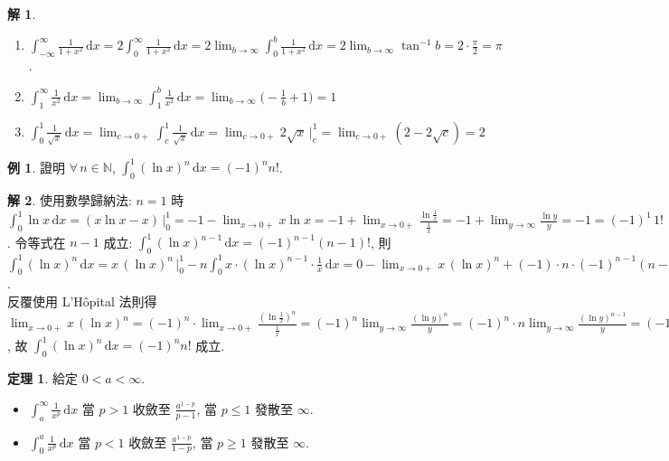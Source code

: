 \documentclass[12pt]{extarticle}
\newcommand{\ds}{\displaystyle}
\theoremstyle{definition}
\newtheorem*{thm}{定理}
\newtheorem*{ex}{例}
\newtheorem*{sol}{解}
\begin{document}
\begin{sol}\leavevmode
  \begin{enumerate}\setlength{\itemsep}{0pt}
    \item $\ds\int_{-\infty}^{\infty}\!\frac{1}{1 + x^2}\,\text{d}x = 2\int_0^\infty\!\frac{1}{1 + x^2}\,\text{d}x = 2\lim_{b\to\infty}\int_0^b\!\frac{1}{1 + x^2}\,\text{d}x = 2\lim_{b\to\infty}\tan^{-1} b = 2\cdot\frac{\pi}{2} = \pi$. 
    \item $\ds\int_{1}^{\infty}\!\frac{1}{x^2}\,\text{d}x = \lim_{b\to\infty}\int_1^b\!\frac{1}{x^2}\,\text{d}x = \lim_{b\to\infty}\Big(-\frac{1}{b} + 1\Big) = 1$
    \item $\ds\int_0^1\!\frac{1}{\sqrt{x}}\,\text{d}x = \lim_{c\to0+}\int_c^1\!\frac{1}{\sqrt{x}}\,\text{d}x = \lim_{c\to0+}2\sqrt{x}\,\Big|^1_c = \lim_{c\to0+}(2-2\sqrt{c}) = 2$
  \end{enumerate}
\end{sol}

\begin{ex}
  證明 $\forall\,n\in\mathbb{N}$, $\ds\int_0^1(\ln x)^n\,\text{d}x = (-1)^n n!$.
\end{ex}

\begin{sol}
  使用數學歸納法: $n = 1$ 時 $\ds\int_0^1\ln x\,\text{d}x = (x\ln x - x)\,\Big|_0^1 = -1 - \lim_{x\to 0+}x\ln x = -1 + \lim_{x\to 0+}\frac{\ln\frac{1}{x}}{\frac{1}{x}} = -1 + \lim_{y\to\infty}\frac{\ln y}{y} = -1 = (-1)^1\,1!$. 令等式在 $n - 1$ 成立: $\ds\int_0^1(\ln x)^{n - 1}\,\text{d}x = (-1)^{n - 1} (n - 1)!$, 則 $\ds\int_0^1(\ln x)^n\,\text{d}x = x\,(\ln x)^n\,\Big|_0^1 - n\int_0^1\!x\cdot(\ln x)^{n - 1}\cdot\frac{1}{x}\,\text{d}x = 0 - \lim_{x\to0+}x\,(\ln x)^n + (-1)\cdot n\cdot(-1)^{n - 1}(n - 1)! = -\lim_{x\to0+}x\,(\ln x)^n + (-1)^n n!$. \\ 反覆使用 L'H\^opital 法則得 $\ds\lim_{x\to0+}x\,(\ln x)^n = (-1)^n\cdot\lim_{x\to0+}\frac{(\ln\frac{1}{x})^n}{\frac{1}{x}} = (-1)^n\lim_{y\to\infty}\frac{(\ln y)^n}{y} = (-1)^n\cdot n\lim_{y\to\infty}\frac{(\ln y)^{n - 1}}{y} = (-1)^n\cdot n(n - 1)\lim_{y\to\infty}\frac{(\ln y)^{n - 2}}{y} = \cdots = (-1)^n\,n!\lim_{y\to\infty}\frac{1}{y} = 0$, 故 $\ds\int_0^1(\ln x)^n\,\text{d}x = (-1)^n n!$ 成立. 
\end{sol}

\begin{thm} 給定 $\ds 0 < a < \infty$. 
  \begin{itemize}\setlength{\itemsep}{0pt}
    \item $\ds\int_a^\infty\!\frac{1}{x^p}\,\text{d}x$ 當 $p > 1$ 收斂至 $\ds\frac{a^{1-p}}{p - 1}$, 當 $\ds p\leqslant 1$ 發散至 $\infty$. 
    \item $\ds\int_0^{a}\!\frac{1}{x^p}\,\text{d}x$ 當 $p < 1$ 收斂至 $\ds\frac{a^{1-p}}{1 - p}$, 當 $p\geqslant 1$ 發散至 $\infty$. 
  \end{itemize}
\end{thm}
\end{document}
